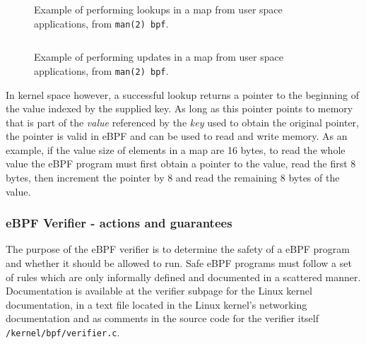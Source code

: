 \begin{figure}[htbp!]
  \centering
  \inputminted[linenos]{C}{snippets/map_lookup_struct.c}
  \caption{Example of performing lookups in a map from user space applications, from \texttt{man(2) bpf}.}
  \label{snip:map_lookup}
\end{figure}

\begin{figure}[htbp!]
  \centering
  \inputminted[linenos]{C}{snippets/map_update_struct.c}
  \caption{Example of performing updates in a map from user space applications, from \texttt{man(2) bpf}.}
  \label{snip:map_update}
\end{figure}

In kernel space however, a successful lookup returns a pointer to the beginning of the value indexed by the supplied key. As long as this pointer points to memory that is part of the \textit{value} referenced by the \textit{key} used to obtain the original pointer, the pointer is valid in eBPF and can be used to read and write memory. As an example, if the value size of elements in a map are 16 bytes, to read the whole value the eBPF program must first obtain a pointer to the value, read the first 8 bytes, then increment the pointer by 8 and read the remaining 8 bytes of the value.


\subsubsection{eBPF Verifier - actions and guarantees}


The purpose of the eBPF verifier is to determine the safety of a eBPF program and whether it should be allowed to run.
Safe eBPF programs must follow a set of rules which are only informally defined and documented in a scattered manner. Documentation is available at the verifier subpage for the Linux kernel documentation\cite{ebpf-verifier}, in a text file located in the Linux kernel's networking documentation\cite{ebpf-filter} and as comments in the source code for the verifier itself
\texttt{/kernel/bpf/verifier.c}\cite{ebpf-verifier-source}. 

